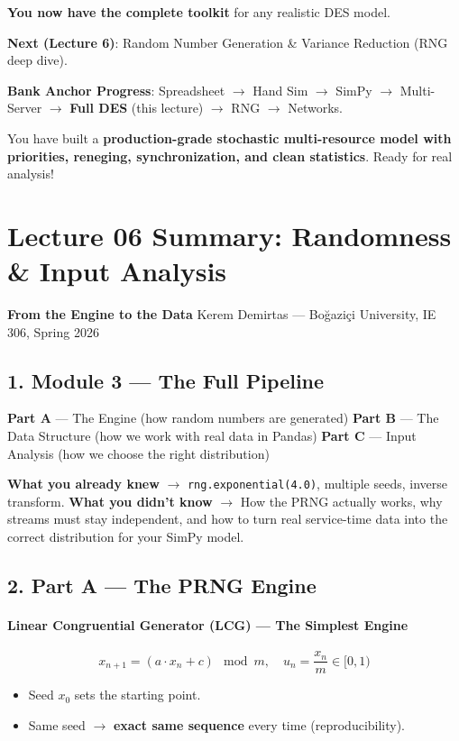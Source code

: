 \documentclass[11pt]{article}
\begin{document}
\textbf{You now have the complete toolkit} for any realistic DES model.

\textbf{Next (Lecture 6)}: Random Number Generation \& Variance Reduction (RNG deep dive).

\textbf{Bank Anchor Progress}: Spreadsheet $\rightarrow$ Hand Sim $\rightarrow$ SimPy $\rightarrow$ Multi-Server $\rightarrow$ \textbf{Full DES} (this lecture) $\rightarrow$ RNG $\rightarrow$ Networks.

You have built a \textbf{production-grade stochastic multi-resource model with priorities, reneging, synchronization, and clean statistics}. Ready for real analysis!

\section*{Lecture 06 Summary: Randomness \& Input Analysis}
\textbf{From the Engine to the Data}
Kerem Demirtas --- Boğaziçi University, IE 306, Spring 2026

\subsection*{1. Module 3 --- The Full Pipeline}
\textbf{Part A} --- The Engine (how random numbers are generated)  
\textbf{Part B} --- The Data Structure (how we work with real data in Pandas)  
\textbf{Part C} --- Input Analysis (how we choose the right distribution)

\textbf{What you already knew} $\rightarrow$ \texttt{rng.exponential(4.0)}, multiple seeds, inverse transform.  
\textbf{What you didn't know} $\rightarrow$ How the PRNG actually works, why streams must stay independent, and how to turn real service-time data into the correct distribution for your SimPy model.

\subsection*{2. Part A --- The PRNG Engine}

\paragraph*{Linear Congruential Generator (LCG) --- The Simplest Engine}
\[
x_{n+1} = (a \cdot x_n + c) \mod m, \quad u_n = \frac{x_n}{m} \in [0,1)
\]
\begin{itemize}[leftmargin=*]
\item Seed \(x_0\) sets the starting point.
\item Same seed $\rightarrow$ \textbf{exact same sequence} every time (reproducibility).
\end{itemize}
\end{document}
